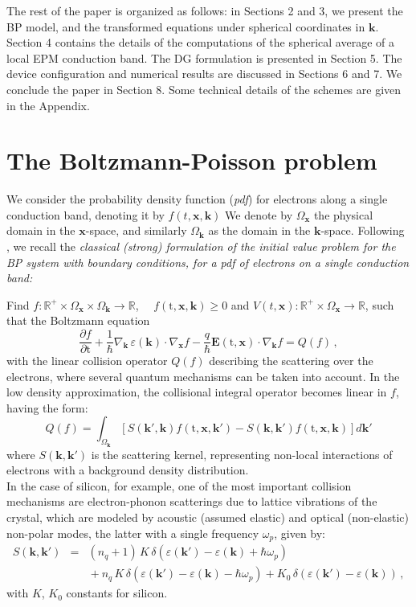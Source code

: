 \documentclass[11pt]{article}
\newcommand{\bk}{\mathbf{k}}
\newcommand{\bx}{\mathbf{x}}
\newcommand{\eps}{\varepsilon}
\newcommand{\bE}{\mathbf{E}}
\newcommand{\ti}{\mathrm{t}}
\newcommand{\hw}{\hbar \omega_{p}}
\newcommand{\domk}{\Omega_{\bk}}
\newcommand{\intd}{\int_{\domk}}
\newcommand{\enk}{\eps(\bk)}
\newcommand{\bka}{\bk'}
\newcommand{\enka}{\eps(\bka)}
\begin{document}
The rest of the paper is 
organized as follows: in Sections 2 and 3, we present the BP model, and the transformed equations under spherical coordinates in $\bk$. Section 4 contains the details of the computations of the spherical average of a local EPM conduction band. The DG formulation is presented in Section 5.  The device configuration and numerical results are discussed in Sections 6 and 7. We conclude the paper in Section 8. Some technical details of the schemes are given in the Appendix.
%
%
%
%
\section{The Boltzmann-Poisson problem}

%
%
We consider the probability density function (\emph{pdf}) for electrons along a single conduction band, denoting it by $f(t,\bx,\bk)$
We denote by $\Omega_{\bx}$ the physical domain in the $\bx$-space, and similarly $\domk$ as the domain in the $\bk$-space.
Following \cite{ref:MarkowichRS}, we recall the \emph{classical (strong) formulation of the initial value problem for the BP system with boundary 
conditions, for a pdf of electrons on a single conduction band:} 

Find $f: \mathbb{R}^{+} \times \Omega_{\bx} \times \domk \rightarrow  \mathbb{R}$, $\quad 
f(\ti,\bx,\bk) 
\geq 0$ and $V(t, \bx): \mathbb{R}^{+} \times \Omega_{\bx} \rightarrow  \mathbb{R}$, 
such that the Boltzmann equation
%
$$
\frac{\partial f}{\partial \ti} + \frac{1}{\hbar} \nabla_{\bk} \,
\varepsilon (\bk) \cdot \nabla_{\bx} f -
 \frac{q}{\hbar} \bE (\ti,\bx) \cdot \nabla_{\bk} f = Q(f) \, ,
$$
with the linear collision operator $Q(f)$ describing the 
scattering over the electrons,
where several quantum mechanisms can be taken into account.
In the low density approximation, the collisional 
integral operator becomes linear in $f$, having the form:
%
\begin{equation}
Q(f) = \intd \left[ S(\bk', \bk) f(\ti, \bx, \bk') - S(\bk, \bk') f(\ti, \bx, \bk) \right] d \bk'
\label{ope_coll}
\end{equation}
%
where $S(\bk,\bk')$ is the scattering kernel,
representing non-local interactions of electrons with a background
density distribution.
 \\
%
In the case of silicon, for example, one of the most important collision mechanisms are electron-phonon 
scatterings due to lattice vibrations of the cry\-stal, which are modeled by  acoustic (assumed elastic) and optical (non-elastic) 
non-polar modes, the latter with a single frequency $\omega_{p}$, given by: 
%
\begin{eqnarray}
S(\bk, \bk') & = & (n_{q} + 1) \, K \, \delta(\enka - \enk + \hw) \nonumber
\\
&&
\mbox{} + n_{q} \, K \, \delta(\enka - \enk - \hw) +  K_{0} \, \delta(\enka - \enk) \, ,
\label{Skkarrow}
\end{eqnarray}
%
with $K$, $K_{0}$ constants for silicon. 
\end{document}
